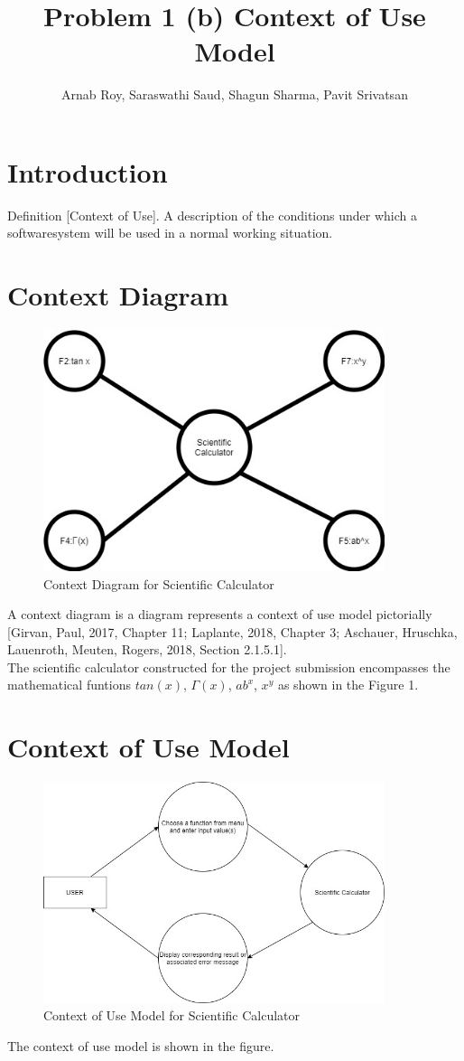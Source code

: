 \documentclass{article}
\title{Problem 1 (b) Context of Use Model}
\author{Arnab Roy, Saraswathi Saud, Shagun Sharma, Pavit Srivatsan }
\begin{document}
\date{}
\maketitle

\section{Introduction}
Definition [Context of Use]. A description of the conditions under which a softwaresystem will be used in a normal working situation.
\section{Context Diagram}
\begin{figure}[htp]
    \centering
    \includegraphics[width=10cm]{ContextDiagram}
    \caption{Context Diagram for Scientific Calculator}
    \label{fig:context_diag}
\end{figure}
A context diagram is a diagram represents a context of use model pictorially [Girvan,
Paul, 2017, Chapter 11; Laplante, 2018, Chapter 3; Aschauer, Hruschka, Lauenroth,
Meuten, Rogers, 2018, Section 2.1.5.1].
\\The scientific calculator constructed for the project submission encompasses the mathematical funtions $tan(x)$, $\Gamma(x)$, $ab^x$, $x^y$ as shown in the Figure 1.
\section{Context of Use Model}
\begin{figure}[htp]
    \centering
    \includegraphics[width=10cm]{contextofuse}
    \caption{Context of Use Model for Scientific Calculator}
    \label{fig:context_diag}
\end{figure}
The context of use model is shown in the figure. 
\end{document}

